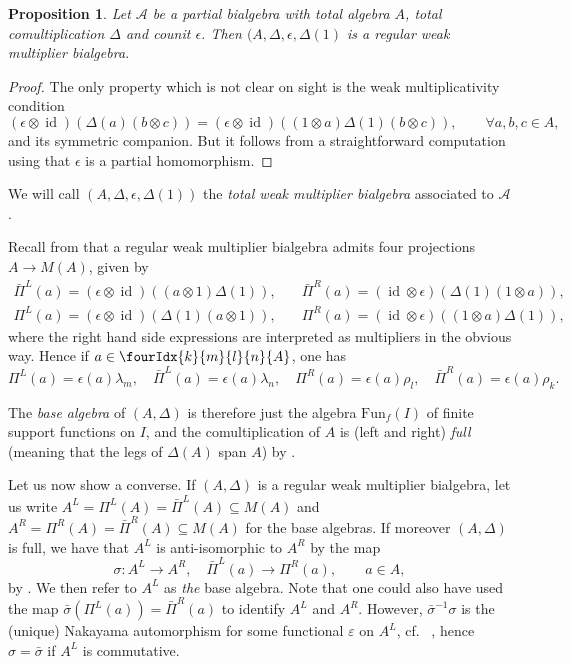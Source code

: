 \documentclass[10pt]{article}
\DeclareMathOperator{\id}{id}
\newcommand{\Fun}{\mathrm{Fun}}
\newcommand{\Gr}[5]{\fourIdx{#2}{#4}{#3}{#5}{#1}}%
\newtheorem{Prop}[Theorem]{Proposition}
\theoremstyle{definition}
\numberwithin{equation}{section}
\begin{document}
\begin{Prop} Let $\mathscr{A}$ be a partial bialgebra with total algebra $A$, total comultiplication $\Delta$ and counit $\epsilon$. Then $(A,\Delta,\epsilon,\Delta(1)$ is a regular weak multiplier bialgebra.
\end{Prop}

\begin{proof} The only property which is not clear on sight is the weak multiplicativity condition \[(\epsilon\otimes \id)(\Delta(a)(b\otimes c)) = (\epsilon\otimes \id)((1\otimes a)\Delta(1)(b\otimes c)),\qquad \forall a,b,c\in A,\] and its symmetric companion. But it follows from a straightforward computation using that $\epsilon$ is a partial homomorphism.  
\end{proof} 

We will call $(A,\Delta,\epsilon,\Delta(1))$ the \emph{total weak multiplier bialgebra} associated to $\mathscr{A}$.

Recall from \cite[Section 3]{Boh1} that a regular weak multiplier
bialgebra admits four projections $A\rightarrow M(A)$, given
by \begin{align*} \bar{\Pi}^L(a) = (\epsilon\otimes \id)((a\otimes
  1)\Delta(1)),\quad & \bar{\Pi}^R(a) = (\id\otimes
  \epsilon)(\Delta(1)(1\otimes a)),\\ \Pi^L(a) = (\epsilon\otimes
  \id)(\Delta(1)(a\otimes 1)),\quad& \Pi^R(a) =
  (\id\otimes\epsilon)((1\otimes a)\Delta(1)),\end{align*} where the
right hand side expressions are interpreted as multipliers in the
obvious way. Hence if $a\in \Gr{A}{k}{l}{m}{n}$, one has \[ \Pi^L(a) = \epsilon(a)\lambda_m,\quad \bar{\Pi}^L(a) = \epsilon(a) \lambda_n, \quad \Pi^R(a) = \epsilon(a) \rho_l,\quad \bar{\Pi}^R(a) = \epsilon(a)\rho_k.\]

The \emph{base algebra} of $(A,\Delta)$ is therefore just the algebra
$\Fun_{f}(I)$ of finite support functions on $I$, and the
comultiplication of $A$ is (left and right) \emph{full} (meaning that the legs of $\Delta(A)$ span $A$) by \cite[Theorem 3.13]{Boh1}.  

Let us now show a converse. If $(A,\Delta)$ is a regular weak multiplier bialgebra, let us write $A^L = \Pi^L(A) = \bar{\Pi}^L(A)\subseteq M(A)$ and $A^R = \Pi^R(A)= \bar{\Pi}^R(A)\subseteq M(A)$ for the base algebras. If moreover $(A,\Delta)$ is full, we have that $A^L$ is anti-isomorphic to $A^R$ by the map \[\sigma: A^L \rightarrow A^R, \quad \bar{\Pi}^L(a) \rightarrow \Pi^R(a), \qquad a\in A,\] by \cite[Lemma 4.8]{Boh1}. We then refer to $A^L$ as \emph{the} base algebra. Note that one could also have used the map $\bar{\sigma}(\Pi^L(a)) = \bar{\Pi}^R(a)$ to identify $A^L$ and $A^R$. However, $\bar{\sigma}^{-1}\sigma$ is the (unique) Nakayama automorphism for some functional $\varepsilon$ on $A^L$, cf.~ \cite[Proposition 4.9]{Boh1}, hence $\sigma = \bar{\sigma}$ if $A^L$ is commutative.
\end{document}
